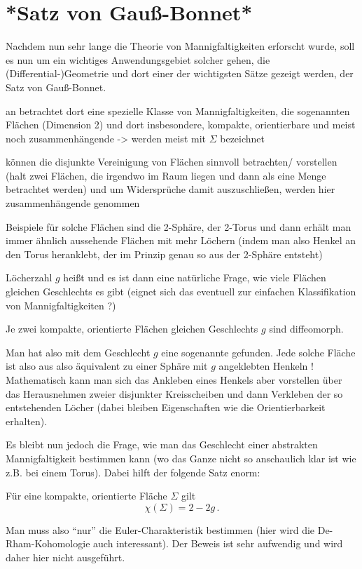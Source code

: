 \documentclass[../H_Analysis_main.tex]{subfiles}
\begin{document}
\newpage


	\section{*Satz von Gauß-Bonnet*}
Nachdem nun sehr lange die Theorie von Mannigfaltigkeiten erforscht wurde, soll es nun um ein wichtiges Anwendungsgebiet solcher gehen, die (Differential-)Geometrie und dort einer der wichtigsten Sätze gezeigt werden, der Satz von Gauß-Bonnet.


an betrachtet dort eine spezielle Klasse von Mannigfaltigkeiten, die sogenannten Flächen (Dimension 2) und dort insbesondere, kompakte, orientierbare und meist noch zusammenhängende -> werden meist mit $\Sigma$ bezeichnet

können die disjunkte Vereinigung von Flächen sinnvoll betrachten/ vorstellen (halt zwei Flächen, die irgendwo im Raum liegen und dann als eine Menge betrachtet werden) und um Widersprüche damit auszuschließen, werden hier zusammenhängende genommen

Beispiele für solche Flächen sind die 2-Sphäre, der 2-Torus und dann erhält man immer ähnlich aussehende Flächen mit mehr Löchern (indem man also Henkel an den Torus heranklebt, der im Prinzip genau so aus der 2-Sphäre entsteht)

Löcherzahl $g$ heißt  und es ist dann eine natürliche Frage, wie viele Flächen gleichen Geschlechts es gibt (eignet sich das eventuell zur einfachen Klassifikation von Mannigfaltigkeiten ?)

\begin{satz}
Je zwei kompakte, orientierte Flächen gleichen Geschlechts $g$ sind diffeomorph.
\end{satz}
Man hat also mit dem Geschlecht $g$ eine sogenannte  gefunden. Jede solche Fläche ist also aus also äquivalent zu einer Sphäre mit $g$ angeklebten Henkeln ! Mathematisch kann man sich das Ankleben eines Henkels aber vorstellen über das Herausnehmen zweier disjunkter Kreisscheiben und dann Verkleben der so entstehenden Löcher (dabei bleiben Eigenschaften wie die Orientierbarkeit erhalten).

Es bleibt nun jedoch die Frage, wie man das Geschlecht einer abstrakten Mannigfaltigkeit bestimmen kann (wo das Ganze nicht so anschaulich klar ist wie z.B. bei einem Torus). Dabei hilft der folgende Satz enorm:
\begin{satz}
Für eine kompakte, orientierte Fläche $\Sigma$ gilt
\begin{equation}
\chi(\Sigma) = 2 - 2g \, .
\end{equation}
\end{satz}
Man muss also \enquote{nur} die Euler-Charakteristik bestimmen (hier wird die De-Rham-Kohomologie auch interessant). Der Beweis ist sehr aufwendig und wird daher hier nicht ausgeführt.
\end{document}
